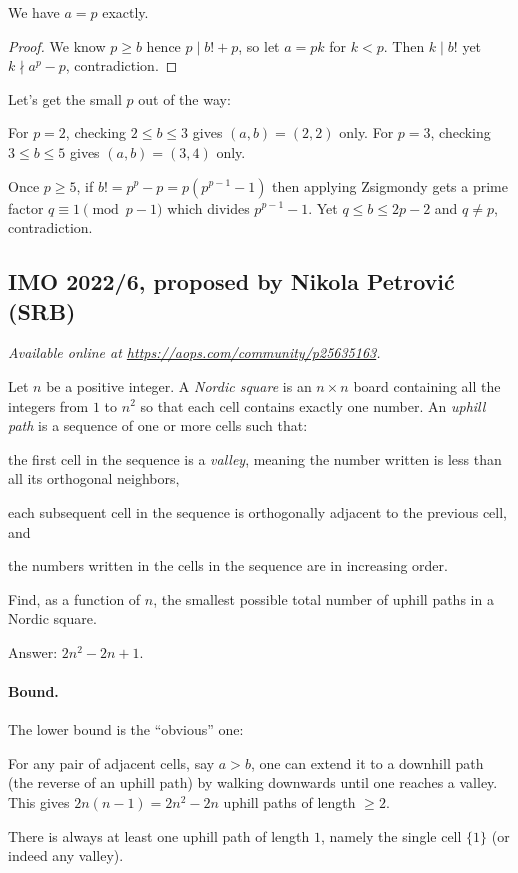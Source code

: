 \documentclass[11pt]{scrartcl}
\begin{document}
\begin{claim*}
  We have $a=p$ exactly.
\end{claim*}
\begin{proof}
  We know $p \ge b$ hence $p \mid b!+p$, so let $a = pk$ for $k < p$.
  Then $k \mid b!$ yet $k \nmid a^p-p$, contradiction.
\end{proof}

Let's get the small $p$ out of the way:
\begin{itemize}
  \ii For $p=2$, checking $2 \le b \le 3$ gives $(a,b)=(2,2)$ only.
  \ii For $p=3$, checking $3 \le b \le 5$ gives $(a,b)=(3,4)$ only.
\end{itemize}
Once $p \ge 5$, if $b! = p^p - p = p(p^{p-1}-1)$
then applying Zsigmondy gets a prime factor $q \equiv 1 \pmod{p-1}$
which divides $p^{p-1}-1$.
Yet $q \le b \le 2p-2$ and $q \neq p$, contradiction.
\pagebreak

\subsection{IMO 2022/6, proposed by Nikola Petrovi\'{c} (SRB)}
\textsl{Available online at \url{https://aops.com/community/p25635163}.}
\begin{mdframed}[style=mdpurplebox,frametitle={Problem statement}]
Let $n$ be a positive integer.
A \emph{Nordic square} is an $n \times n$ board
containing all the integers from $1$ to $n^2$
so that each cell contains exactly one number.
An \emph{uphill path} is a sequence of one or more cells such that:
\begin{enumerate}
  \ii the first cell in the sequence is a \emph{valley},
  meaning the number written is less than all its orthogonal neighbors,

  \ii each subsequent cell in the sequence is orthogonally
  adjacent to the previous cell, and

  \ii the numbers written in the cells in the sequence are in increasing order.
\end{enumerate}
Find, as a function of $n$, the smallest possible total number
of uphill paths in a Nordic square.
\end{mdframed}
Answer: $2n^2-2n+1$.

\paragraph{Bound.}
The lower bound is the ``obvious'' one:
\begin{itemize}
  \ii For any pair of adjacent cells, say $a > b$,
  one can extend it to a downhill path (the reverse of an uphill path)
  by walking downwards until one reaches a valley.
  This gives $2n(n-1)=2n^2-2n$ uphill paths of length $\ge 2$.

  \ii There is always at least one uphill path of length $1$,
  namely the single cell $\{1\}$ (or indeed any valley).
\end{itemize}
\end{document}
